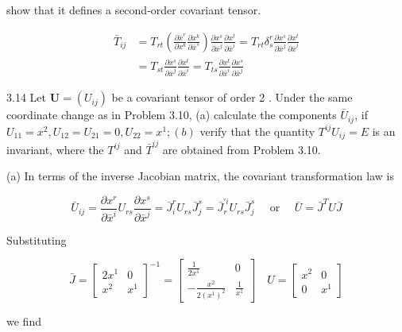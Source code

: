 \documentclass[10pt]{article}
\begin{document}
show that it defines a second-order covariant tensor.

$$
\begin{aligned}
\bar{T}_{i j} & =T_{r t}\left(\frac{\partial \bar{x}^{r}}{\partial x^{k}} \frac{\partial x^{k}}{\partial \bar{x}^{s}}\right) \frac{\partial x^{s}}{\partial \bar{x}^{j}} \frac{\partial x^{t}}{\partial \bar{x}^{i}}=T_{r t} \delta_{s}^{r} \frac{\partial x^{s}}{\partial \bar{x}^{j}} \frac{\partial x^{t}}{\partial \bar{x}^{i}} \\
& =T_{s t} \frac{\partial x^{s}}{\partial \bar{x}^{j}} \frac{\partial x^{t}}{\partial \bar{x}^{i}}=T_{t s} \frac{\partial x^{t}}{\partial \bar{x}^{i}} \frac{\partial x^{s}}{\partial \bar{x}^{j}}
\end{aligned}
$$

3.14 Let $\mathbf{U}=\left(U_{i j}\right)$ be a covariant tensor of order 2 . Under the same coordinate change as in Problem 3.10, (a) calculate the components $\bar{U}_{i j}$, if $U_{11}=x^{2}, U_{12}=U_{21}=0, U_{22}=x^{1} ;(b)$ verify that the quantity $T^{i j} U_{i j}=E$ is an invariant, where the $T^{i j}$ and $\bar{T}^{i j}$ are obtained from Problem 3.10.

(a) In terms of the inverse Jacobian matrix, the covariant transformation law is

$$
\bar{U}_{i j}=\frac{\partial x^{r}}{\partial \bar{x}^{i}} U_{r s} \frac{\partial x^{s}}{\partial \bar{x}^{j}}=\bar{J}_{i}^{r} U_{r s} \bar{J}_{j}^{s}=\bar{J}_{r}^{\prime i} U_{r s} \bar{J}_{j}^{s} \quad \text { or } \quad \bar{U}=\bar{J}^{T} U \bar{J}
$$

Substituting

$$
\bar{J}=\left[\begin{array}{cc}
2 x^{1} & 0 \\
x^{2} & x^{1}
\end{array}\right]^{-1}=\left[\begin{array}{rr}
\frac{1}{2 x^{1}} & 0 \\
-\frac{x^{2}}{2\left(x^{1}\right)^{2}} & \frac{1}{x^{1}}
\end{array}\right] \quad U=\left[\begin{array}{cc}
x^{2} & 0 \\
0 & x^{1}
\end{array}\right]
$$

we find
\end{document}
